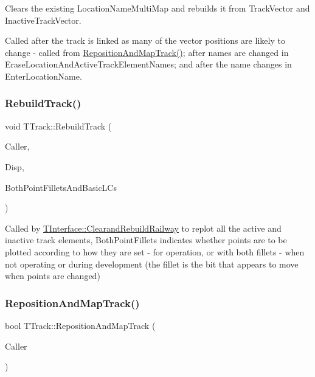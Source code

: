 Clears the existing Location\+Name\+Multi\+Map and rebuilds it from Track\+Vector and Inactive\+Track\+Vector.

Called after the track is linked as many of the vector positions are likely to change -\/ called from \mbox{\hyperlink{class_t_track_a5e2e215fae5247206220d301c324e9a0}{Reposition\+And\+Map\+Track()}}; after names are changed in Erase\+Location\+And\+Active\+Track\+Element\+Names; and after the name changes in Enter\+Location\+Name. \mbox{\label{class_t_track_afbd25aa0deb973061c8500a4509136e0}} 
\subsubsection{\texorpdfstring{Rebuild\+Track()}{RebuildTrack()}}
{\footnotesize\ttfamily void T\+Track\+::\+Rebuild\+Track (\begin{DoxyParamCaption}\item[{int}]{Caller,  }\item[{\mbox{\hyperlink{class_t_display}{T\+Display}} $\ast$}]{Disp,  }\item[{bool}]{Both\+Point\+Fillets\+And\+Basic\+L\+Cs }\end{DoxyParamCaption})}

Called by \mbox{\hyperlink{class_t_interface_aaa05ac95703a25e1fb4863779854967c}{T\+Interface\+::\+Clearand\+Rebuild\+Railway}} to replot all the active and inactive track elements, Both\+Point\+Fillets indicates whether points are to be plotted according to how they are set -\/ for operation, or with both fillets -\/ when not operating or during development (the fillet is the bit that appears to move when points are changed) \mbox{\label{class_t_track_a5e2e215fae5247206220d301c324e9a0}} 
\subsubsection{\texorpdfstring{Reposition\+And\+Map\+Track()}{RepositionAndMapTrack()}}
{\footnotesize\ttfamily bool T\+Track\+::\+Reposition\+And\+Map\+Track (\begin{DoxyParamCaption}\item[{int}]{Caller }\end{DoxyParamCaption})}

